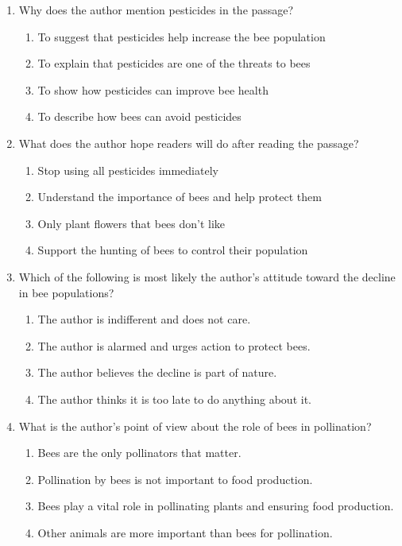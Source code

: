 \documentclass[12pt]{article}
\begin{document}
\begin{enumerate}
    \vspace{0.5cm}

    \item Why does the author mention pesticides in the passage?
    \begin{enumerate}[label=\Alph*.]
        \item To suggest that pesticides help increase the bee population
        \item To explain that pesticides are one of the threats to bees
        \item To show how pesticides can improve bee health
        \item To describe how bees can avoid pesticides
    \end{enumerate}

    \vspace{0.5cm}

    \item What does the author hope readers will do after reading the passage?
    \begin{enumerate}[label=\Alph*.]
        \item Stop using all pesticides immediately
        \item Understand the importance of bees and help protect them
        \item Only plant flowers that bees don’t like
        \item Support the hunting of bees to control their population
    \end{enumerate}

    \vspace{0.5cm}

    \item Which of the following is most likely the author's attitude toward the decline in bee populations?
    \begin{enumerate}[label=\Alph*.]
        \item The author is indifferent and does not care.
        \item The author is alarmed and urges action to protect bees.
        \item The author believes the decline is part of nature.
        \item The author thinks it is too late to do anything about it.
    \end{enumerate}

    \vspace{0.5cm}

    \item What is the author's point of view about the role of bees in pollination?
    \begin{enumerate}[label=\Alph*.]
        \item Bees are the only pollinators that matter.
        \item Pollination by bees is not important to food production.
        \item Bees play a vital role in pollinating plants and ensuring food production.
        \item Other animals are more important than bees for pollination.
    \end{enumerate}


\end{enumerate}
\end{document}
